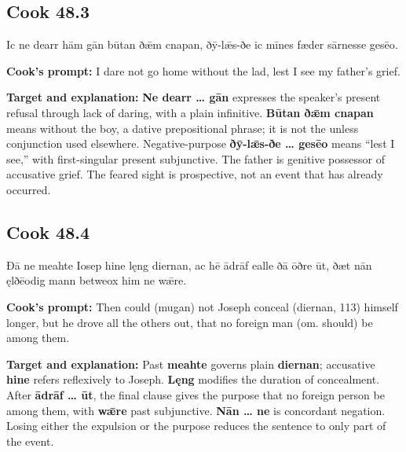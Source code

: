 \par\begin{minipage}{\linewidth}\raggedright
\subsection*{Cook 48.3}

Ic ne dearr hām gān būtan ðǣm cnapan, ðȳ-lǣs-ðe ic mīnes fæder sārnesse gesēo.

\textbf{Cook’s prompt:} I dare not go home without the lad, lest I see my father’s grief.

\textbf{Target and explanation:} \textbf{Ne dearr … gān} expresses the speaker’s present refusal through lack of daring, with a plain infinitive. \textbf{Būtan ðǣm cnapan} means without the boy, a dative prepositional phrase; it is not the unless conjunction used elsewhere. Negative-purpose \textbf{ðȳ-lǣs-ðe … gesēo} means “lest I see,” with first-singular present subjunctive. The father is genitive possessor of accusative grief. The feared sight is prospective, not an event that has already occurred.

\end{minipage}\par\addvspace{4pt}

\par\begin{minipage}{\linewidth}\raggedright
\subsection*{Cook 48.4}

Ðā ne meahte Iosep hine lęng diernan, ac hē ādrāf ealle ðā ōðre ūt, ðæt nān ęlðēodig mann betweox him ne wǣre.

\textbf{Cook’s prompt:} Then could (mugan) not Joseph conceal (diernan, 113) himself longer, but he drove all the others out, that no foreign man (om. should) be among them.

\textbf{Target and explanation:} Past \textbf{meahte} governs plain \textbf{diernan}; accusative \textbf{hine} refers reflexively to Joseph. \textbf{Lęng} modifies the duration of concealment. After \textbf{ādrāf … ūt}, the final clause gives the purpose that no foreign person be among them, with \textbf{wǣre} past subjunctive. \textbf{Nān … ne} is concordant negation. Losing either the expulsion or the purpose reduces the sentence to only part of the event.

\end{minipage}\par\addvspace{4pt}

